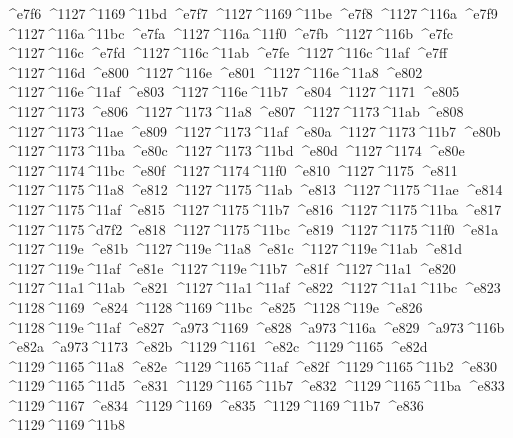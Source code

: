 \checkit ^^^^e7f6 ^^^^1127^^^^1169^^^^11bd
\checkit ^^^^e7f7 ^^^^1127^^^^1169^^^^11be
\checkit ^^^^e7f8 ^^^^1127^^^^116a
\checkit ^^^^e7f9 ^^^^1127^^^^116a^^^^11bc
\checkit ^^^^e7fa ^^^^1127^^^^116a^^^^11f0
\checkit ^^^^e7fb ^^^^1127^^^^116b
\checkit ^^^^e7fc ^^^^1127^^^^116c
\checkit ^^^^e7fd ^^^^1127^^^^116c^^^^11ab
\checkit ^^^^e7fe ^^^^1127^^^^116c^^^^11af
\checkit ^^^^e7ff ^^^^1127^^^^116d
\checkit ^^^^e800 ^^^^1127^^^^116e
\checkit ^^^^e801 ^^^^1127^^^^116e^^^^11a8
\checkit ^^^^e802 ^^^^1127^^^^116e^^^^11af
\checkit ^^^^e803 ^^^^1127^^^^116e^^^^11b7
\checkit ^^^^e804 ^^^^1127^^^^1171
\checkit ^^^^e805 ^^^^1127^^^^1173
\checkit ^^^^e806 ^^^^1127^^^^1173^^^^11a8
\checkit ^^^^e807 ^^^^1127^^^^1173^^^^11ab
\checkit ^^^^e808 ^^^^1127^^^^1173^^^^11ae
\checkit ^^^^e809 ^^^^1127^^^^1173^^^^11af
\checkit ^^^^e80a ^^^^1127^^^^1173^^^^11b7
\checkit ^^^^e80b ^^^^1127^^^^1173^^^^11ba
\checkit ^^^^e80c ^^^^1127^^^^1173^^^^11bd
\checkit ^^^^e80d ^^^^1127^^^^1174
\checkit ^^^^e80e ^^^^1127^^^^1174^^^^11bc
\checkit ^^^^e80f ^^^^1127^^^^1174^^^^11f0
\checkit ^^^^e810 ^^^^1127^^^^1175
\checkit ^^^^e811 ^^^^1127^^^^1175^^^^11a8
\checkit ^^^^e812 ^^^^1127^^^^1175^^^^11ab
\checkit ^^^^e813 ^^^^1127^^^^1175^^^^11ae
\checkit ^^^^e814 ^^^^1127^^^^1175^^^^11af
\checkit ^^^^e815 ^^^^1127^^^^1175^^^^11b7
\checkit ^^^^e816 ^^^^1127^^^^1175^^^^11ba
\checkit ^^^^e817 ^^^^1127^^^^1175^^^^d7f2
\checkit ^^^^e818 ^^^^1127^^^^1175^^^^11bc
\checkit ^^^^e819 ^^^^1127^^^^1175^^^^11f0
\checkit ^^^^e81a ^^^^1127^^^^119e
\checkit ^^^^e81b ^^^^1127^^^^119e^^^^11a8
\checkit ^^^^e81c ^^^^1127^^^^119e^^^^11ab
\checkit ^^^^e81d ^^^^1127^^^^119e^^^^11af
\checkit ^^^^e81e ^^^^1127^^^^119e^^^^11b7
\checkit ^^^^e81f ^^^^1127^^^^11a1
\checkit ^^^^e820 ^^^^1127^^^^11a1^^^^11ab
\checkit ^^^^e821 ^^^^1127^^^^11a1^^^^11af
\checkit ^^^^e822 ^^^^1127^^^^11a1^^^^11bc
\checkit ^^^^e823 ^^^^1128^^^^1169
\checkit ^^^^e824 ^^^^1128^^^^1169^^^^11bc
\checkit ^^^^e825 ^^^^1128^^^^119e
\checkit ^^^^e826 ^^^^1128^^^^119e^^^^11af
\checkit ^^^^e827 ^^^^a973^^^^1169
\checkit ^^^^e828 ^^^^a973^^^^116a
\checkit ^^^^e829 ^^^^a973^^^^116b
\checkit ^^^^e82a ^^^^a973^^^^1173
\checkit ^^^^e82b ^^^^1129^^^^1161
\checkit ^^^^e82c ^^^^1129^^^^1165
\checkit ^^^^e82d ^^^^1129^^^^1165^^^^11a8
\checkit ^^^^e82e ^^^^1129^^^^1165^^^^11af
\checkit ^^^^e82f ^^^^1129^^^^1165^^^^11b2
\checkit ^^^^e830 ^^^^1129^^^^1165^^^^11d5
\checkit ^^^^e831 ^^^^1129^^^^1165^^^^11b7
\checkit ^^^^e832 ^^^^1129^^^^1165^^^^11ba
\checkit ^^^^e833 ^^^^1129^^^^1167
\checkit ^^^^e834 ^^^^1129^^^^1169
\checkit ^^^^e835 ^^^^1129^^^^1169^^^^11b7
\checkit ^^^^e836 ^^^^1129^^^^1169^^^^11b8
